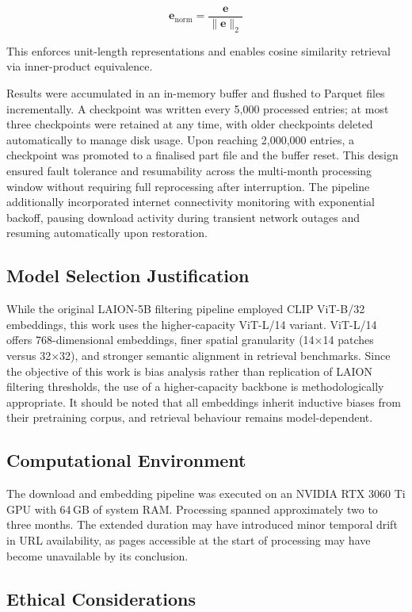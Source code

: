 \[
\mathbf{e}_{\mathrm{norm}} = \frac{\mathbf{e}}{\|\mathbf{e}\|_2}
\]

This enforces unit-length representations and enables cosine similarity retrieval via inner-product equivalence.

Results were accumulated in an in-memory buffer and flushed to Parquet files incrementally. A checkpoint was written every 5,000 processed entries; at most three checkpoints were retained at any time, with older checkpoints deleted automatically to manage disk usage. Upon reaching 2,000,000 entries, a checkpoint was promoted to a finalised part file and the buffer reset. This design ensured fault tolerance and resumability across the multi-month processing window without requiring full reprocessing after interruption. The pipeline additionally incorporated internet connectivity monitoring with exponential backoff, pausing download activity during transient network outages and resuming automatically upon restoration.

\subsection{Model Selection Justification}

While the original LAION-5B filtering pipeline employed CLIP ViT-B/32 embeddings, this work uses the higher-capacity ViT-L/14 variant. ViT-L/14 offers 768-dimensional embeddings, finer spatial granularity (14$\times$14 patches versus 32$\times$32), and stronger semantic alignment in retrieval benchmarks. Since the objective of this work is bias analysis rather than replication of LAION filtering thresholds, the use of a higher-capacity backbone is methodologically appropriate. It should be noted that all embeddings inherit inductive biases from their pretraining corpus, and retrieval behaviour remains model-dependent.

\subsection{Computational Environment}

The download and embedding pipeline was executed on an NVIDIA RTX 3060 Ti GPU with 64\,GB of system RAM. Processing spanned approximately two to three months. The extended duration may have introduced minor temporal drift in URL availability, as pages accessible at the start of processing may have become unavailable by its conclusion.

\subsection{Ethical Considerations}

